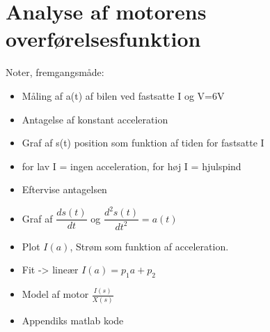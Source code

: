\section{Analyse af motorens overførelsesfunktion}\label{sec:sec_motoroverforelse}

Noter, fremgangsmåde:\\
\begin{itemize}
	\item Måling af a(t) af bilen ved fastsatte I og V=6V
	\item Antagelse af konstant acceleration
	\item Graf af s(t) position som funktion af tiden for fastsatte I
	\item for lav I = ingen acceleration, for høj I = hjulspind
	\item Eftervise antagelsen 
	\item Graf af $\dfrac{ds(t)}{dt}$ og $\dfrac{d^2s(t)}{dt^2} = a(t)$
	\item Plot $I(a)$, Strøm som funktion af acceleration.
	\item Fit -> lineær $I(a) = p_1 a + p_2$
	\item Model af motor $\frac{I(s)}{X(s)}$
	\item Appendiks matlab kode
\end{itemize}
